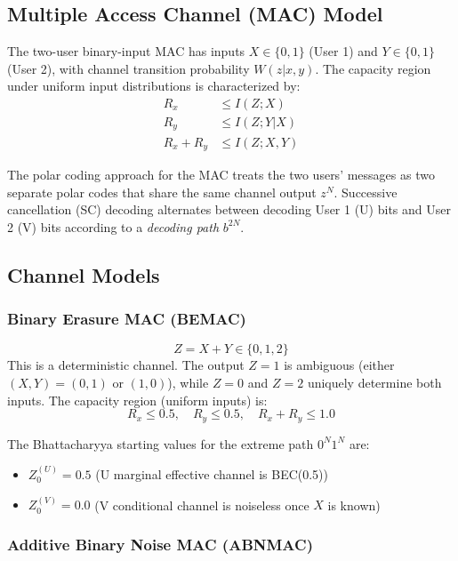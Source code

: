 \documentclass[11pt,a4paper]{article}
\begin{document}
\subsection{Multiple Access Channel (MAC) Model}

The two-user binary-input MAC has inputs $X \in \{0,1\}$ (User 1) and
$Y \in \{0,1\}$ (User 2), with channel transition probability
$W(z | x, y)$. The capacity region under uniform input distributions is
characterized by:
\begin{align}
  R_x &\leq I(Z; X) \\
  R_y &\leq I(Z; Y | X) \\
  R_x + R_y &\leq I(Z; X, Y)
\end{align}

The polar coding approach for the MAC treats the two users' messages as
two separate polar codes that share the same channel output $z^N$.
Successive cancellation (SC) decoding alternates between decoding User 1
(U) bits and User 2 (V) bits according to a \emph{decoding path} $b^{2N}$.

\subsection{Channel Models}

\subsubsection{Binary Erasure MAC (BEMAC)}

\begin{equation}
  Z = X + Y \in \{0, 1, 2\}
\end{equation}
This is a deterministic channel. The output $Z = 1$ is ambiguous (either
$(X,Y) = (0,1)$ or $(1,0)$), while $Z = 0$ and $Z = 2$ uniquely determine
both inputs. The capacity region (uniform inputs) is:
\[
  R_x \leq 0.5, \quad R_y \leq 0.5, \quad R_x + R_y \leq 1.0
\]

The Bhattacharyya starting values for the extreme path $0^N 1^N$ are:
\begin{itemize}
  \item $Z_0^{(U)} = 0.5$ (U marginal effective channel is BEC(0.5))
  \item $Z_0^{(V)} = 0.0$ (V conditional channel is noiseless once $X$ is known)
\end{itemize}

\subsubsection{Additive Binary Noise MAC (ABNMAC)}
\end{document}
